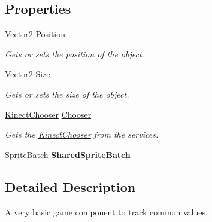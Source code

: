 \subsection*{Properties}
\begin{DoxyCompactItemize}
\item 
Vector2 \hyperlink{class_microsoft_1_1_samples_1_1_kinect_1_1_avateering_1_1_object2_d_a2ed3063bbd65e30889fda66d44eaec68}{Position}
\begin{DoxyCompactList}\small\item\em Gets or sets the position of the object. \end{DoxyCompactList}\item 
Vector2 \hyperlink{class_microsoft_1_1_samples_1_1_kinect_1_1_avateering_1_1_object2_d_ac0f3198c3590593fe7b5d930ce1dab8b}{Size}
\begin{DoxyCompactList}\small\item\em Gets or sets the size of the object. \end{DoxyCompactList}\item 
\hyperlink{class_microsoft_1_1_samples_1_1_kinect_1_1_avateering_1_1_kinect_chooser}{Kinect\+Chooser} \hyperlink{class_microsoft_1_1_samples_1_1_kinect_1_1_avateering_1_1_object2_d_af4e34597d808020610ffc9d148e5257e}{Chooser}
\begin{DoxyCompactList}\small\item\em Gets the \hyperlink{class_microsoft_1_1_samples_1_1_kinect_1_1_avateering_1_1_kinect_chooser}{Kinect\+Chooser} from the services. \end{DoxyCompactList}\item 
\hypertarget{class_microsoft_1_1_samples_1_1_kinect_1_1_avateering_1_1_object2_d_a05ba44b27953eced5e78dbf77c6d4af4}{Sprite\+Batch {\bfseries Shared\+Sprite\+Batch}}\label{class_microsoft_1_1_samples_1_1_kinect_1_1_avateering_1_1_object2_d_a05ba44b27953eced5e78dbf77c6d4af4}

\end{DoxyCompactItemize}


\subsection{Detailed Description}
A very basic game component to track common values. 



